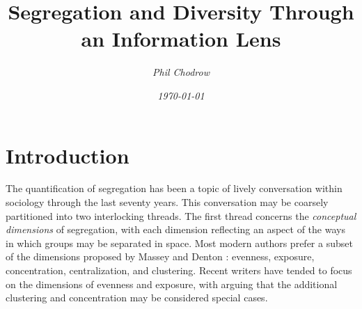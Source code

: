 \documentclass[english]{scrartcl}
\title{Segregation and Diversity Through an Information Lens} %
\author{\emph{Phil Chodrow}}
\date{\emph{\today}}
\begin{document}

\maketitle

\abstract{}

\section{Introduction} \label{sec:intro}


	The quantification of segregation has been a topic of lively conversation within sociology through the last seventy years. This conversation may be coarsely partitioned into two interlocking threads. The first thread concerns the \emph{conceptual dimensions} of segregation, with each dimension reflecting an aspect of the ways in which groups may be separated in space. Most modern authors prefer a subset of the dimensions proposed by Massey and Denton \cite{Massey1988}: evenness, exposure, concentration, centralization, and clustering. Recent writers \cite{Reardon2002,Reardon2004,Roberto2015a,Roberto2015} have tended to focus on the dimensions of evenness and exposure, with \cite{Reardon2004} arguing that the additional clustering and concentration may be considered special cases. 
\end{document}
